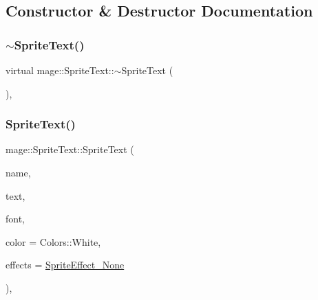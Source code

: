 \subsection{Constructor \& Destructor Documentation}
\hypertarget{classmage_1_1_sprite_text_a0a231f260bb855b7be3280aa74a3e5c6}{}\label{classmage_1_1_sprite_text_a0a231f260bb855b7be3280aa74a3e5c6} 
\subsubsection{\texorpdfstring{$\sim$\+Sprite\+Text()}{~SpriteText()}}
{\footnotesize\ttfamily virtual mage\+::\+Sprite\+Text\+::$\sim$\+Sprite\+Text (\begin{DoxyParamCaption}{ }\end{DoxyParamCaption})\hspace{0.3cm}{\ttfamily [virtual]}, {\ttfamily [default]}}

\hypertarget{classmage_1_1_sprite_text_a1ff744c619c2d70758287da76b98ca9a}{}\label{classmage_1_1_sprite_text_a1ff744c619c2d70758287da76b98ca9a} 
\subsubsection{\texorpdfstring{Sprite\+Text()}{SpriteText()}\hspace{0.1cm}{\footnotesize\ttfamily [1/3]}}
{\footnotesize\ttfamily mage\+::\+Sprite\+Text\+::\+Sprite\+Text (\begin{DoxyParamCaption}\item[{const string \&}]{name,  }\item[{const wstring \&}]{text,  }\item[{\hyperlink{namespacemage_a1e01ae66713838a7a67d30e44c67703e}{Shared\+Ptr}$<$ \hyperlink{classmage_1_1_sprite_font}{Sprite\+Font} $>$}]{font,  }\item[{const X\+M\+V\+E\+C\+T\+OR \&}]{color = {\ttfamily Colors\+:\+:White},  }\item[{\hyperlink{namespacemage_a9cfe18123066ba4236f548f9de75d881}{Sprite\+Effect}}]{effects = {\ttfamily \hyperlink{namespacemage_a9cfe18123066ba4236f548f9de75d881af3c275fbfacfe174da928b2f24dfa515}{Sprite\+Effect\+\_\+\+None}} }\end{DoxyParamCaption})\hspace{0.3cm}{\ttfamily [explicit]}, {\ttfamily [protected]}}


